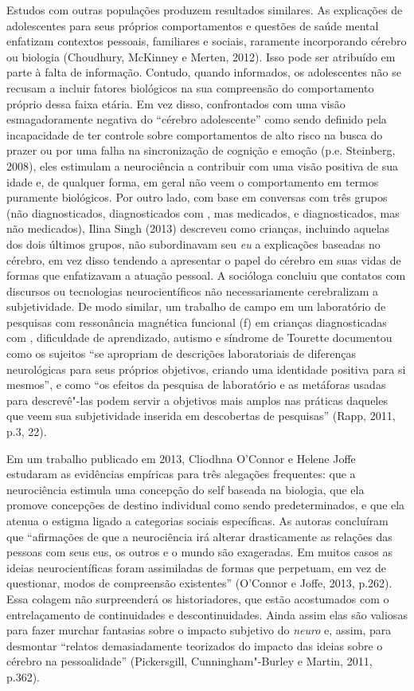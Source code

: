 Estudos com outras populações produzem resultados similares. As
explicações de adolescentes para seus próprios comportamentos e questões
de saúde mental enfatizam contextos pessoais, familiares e sociais,
raramente incorporando cérebro ou biologia (Choudhury, McKinney e
Merten, 2012). Isso pode ser atribuído em parte à falta de informação.
Contudo, quando informados, os adolescentes não se recusam a incluir
fatores biológicos na sua compreensão do comportamento próprio dessa
faixa etária. Em vez disso, confrontados com uma visão esmagadoramente
negativa do ``cérebro adolescente'' como sendo definido pela
incapacidade de ter controle sobre comportamentos de alto risco na busca
do prazer ou por uma falha na sincronização de cognição e emoção (p.e.
Steinberg, 2008), eles estimulam a neurociência a contribuir com uma
visão positiva de sua idade e, de qualquer forma, em geral não veem o
comportamento em termos puramente biológicos. Por outro lado, com base
em conversas com três grupos (não diagnosticados, diagnosticados com
, mas medicados, e diagnosticados, mas não medicados), Ilina Singh
(2013) descreveu como crianças, incluindo aquelas dos dois últimos
grupos, não subordinavam seu \emph{eu} a explicações baseadas no
cérebro, em vez disso tendendo a apresentar o papel do cérebro em suas
vidas de formas que enfatizavam a atuação pessoal. A socióloga concluiu
que contatos com discursos ou tecnologias neurocientíficos não
necessariamente cerebralizam a subjetividade. De modo similar, um
trabalho de campo em um laboratório de pesquisas com ressonância
magnética funcional (f) em crianças diagnosticadas com ,
dificuldade de aprendizado, autismo e síndrome de Tourette documentou
como os sujeitos ``se apropriam de descrições laboratoriais de
diferenças neurológicas para seus próprios objetivos, criando uma
identidade positiva para si mesmos'', e como ``os efeitos da pesquisa de
laboratório e as metáforas usadas para descrevê"-las podem servir a
objetivos mais amplos nas práticas daqueles que veem sua subjetividade
inserida em descobertas de pesquisas'' (Rapp, 2011, p.3, 22).

Em um trabalho publicado em 2013, Cliodhna O'Connor e Helene Joffe
estudaram as evidências empíricas para três alegações frequentes: que a
neurociência estimula uma concepção do self baseada na biologia, que ela
promove concepções de destino individual como sendo predeterminados, e
que ela atenua o estigma ligado a categorias sociais específicas. As
autoras concluíram que ``afirmações de que a neurociência irá alterar
drasticamente as relações das pessoas com seus eus, os outros e o mundo
são exageradas. Em muitos casos as ideias neurocientíficas foram
assimiladas de formas que perpetuam, em vez de questionar, modos de
compreensão existentes'' (O'Connor e Joffe, 2013, p.262). Essa colagem
não surpreenderá os historiadores, que estão acostumados com o
entrelaçamento de continuidades e descontinuidades. Ainda assim elas são
valiosas para fazer murchar fantasias sobre o impacto subjetivo do
\emph{neuro} e, assim, para desmontar ``relatos demasiadamente
teorizados do impacto das ideias sobre o cérebro na pessoalidade''
(Pickersgill, Cunningham"-Burley e Martin, 2011, p.362).

